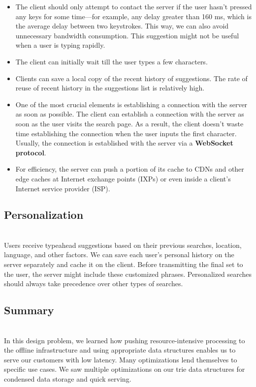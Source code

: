 \begin{itemize}
\item
\protect{}\label{TmsizmC0lYAyh4QEWoAJU}
The client should only attempt to contact the server if the user hasn't pressed any keys for some time---for example, any delay greater than 160 ms, which is the average delay between two keystrokes. This way, we can also avoid unnecessary bandwidth consumption. This suggestion might not be useful when a user is typing rapidly.
\item
\protect{}\label{DvKrwefRi6DF6NbyE-PXT}
The client can initially wait till the user types a few characters.
\item
\protect{}\label{tzC7cMy2pkb41VtzG2_Qv}
Clients can save a local copy of the recent history of suggestions. The rate of reuse of recent history in the suggestions list is relatively high.
\item
\protect{}\label{pW3ApC3PCJQHMdTZFsIJz}
One of the most crucial elements is establishing a connection with the server as soon as possible. The client can establish a connection with the server as soon as the user visits the search page. As a result, the client doesn't waste time establishing the connection when the user inputs the first character. Usually, the connection is established with the server via a \textbf{WebSocket protocol}.
\item
\protect{}\label{P5P8lx5N2YZxRyvC1dkW_}
For efficiency, the server can push a portion of its cache to CDNs and other edge caches at Internet exchange points (IXPs) or even inside a client's Internet service provider (ISP).
\end{itemize}

\subsection{Personalization}\label{djEzDBFCiubx23psYcPiU}
\\
Users receive typeahead suggestions based on their previous searches, location, language, and other factors. We can save each user's personal history on the server separately and cache it on the client. Before transmitting the final set to the user, the server might include these customized phrases. Personalized searches should always take precedence over other types of searches.

\subsection{Summary}\label{Lk0w74uLtk_sXVJdrHDC5}
\\
In this design problem, we learned how pushing resource-intensive processing to the offline infrastructure and using appropriate data structures enables us to serve our customers with low latency. Many optimizations lend themselves to specific use cases. We saw multiple optimizations on our trie data structures for condensed data storage and quick serving.

